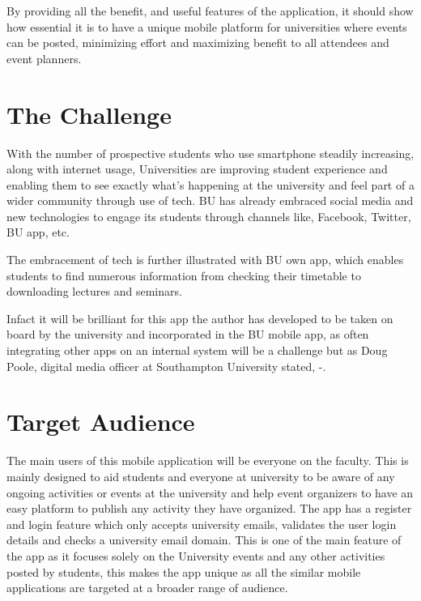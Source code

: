 By providing all the benefit, and useful features of the application, it should show how essential it is to have a unique mobile platform for universities where events can be posted, minimizing effort and maximizing benefit to all attendees and event planners.

\section{The Challenge}
\label{the_challenge}
With the number of prospective students who use smartphone steadily increasing, along with internet usage, Universities are improving student experience and enabling them to see exactly what’s happening at the university and feel part of a wider community through use of tech. BU has already embraced social media and new technologies to engage its students through channels like, Facebook, Twitter, BU app, etc.

The embracement of tech is further illustrated with BU own app, which enables students to find numerous information from checking their timetable to downloading lectures and seminars.

Infact it will be brilliant for this app the author has developed to be taken on board by the university and incorporated in the BU mobile app, as often integrating other apps on an internal system will be a challenge but as Doug Poole, digital media officer at Southampton University stated, -.

\section{Target Audience}
The main users of this mobile application will be everyone on the faculty. This is mainly designed to aid students and everyone at university to be aware of any ongoing activities or events at the university and help event organizers to have an easy platform to publish any activity they have organized. The app has a register and login feature which only accepts university emails, validates the user login details and checks a university email domain. This is one of the main feature of the app as it focuses solely on the University events and any other activities posted by students, this makes the app unique as all the similar mobile applications are targeted at a broader range of audience.

